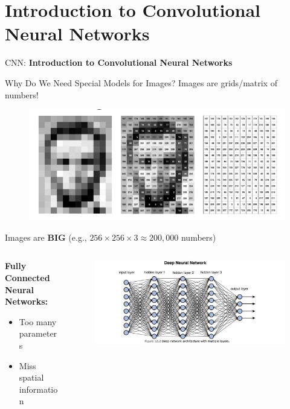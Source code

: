 \section{Introduction to Convolutional Neural Networks}
\begin{frame}{}
    \LARGE CNN: \textbf{Introduction to Convolutional Neural Networks}
\end{frame}

\begin{frame}[allowframebreaks]{Why Do We Need Special Models for Images?}
    Images are grids/matrix of numbers!
    \begin{figure}
        \centering
        \includegraphics[height=0.8\textheight,width=1\textwidth,keepaspectratio]{images/cnn/represent_image.png}
    \end{figure}
    Images are \textbf{BIG} (e.g., $256 \times 256 \times 3 \approx 200,\!000$ numbers)
    \framebreak
    
    \begin{columns}
        \begin{column}{0.35\textwidth}
            \textbf{Fully Connected Neural Networks:} \\[2em]
            \begin{itemize}
                \setlength{\itemsep}{1em}
                \item Too many parameters
                \item Miss spatial information
            \end{itemize}
        \end{column}
        \begin{column}{0.75\textwidth}
            \begin{figure}
                \centering
                \includegraphics[height=0.8\textheight,width=1.05\textwidth,keepaspectratio]{images/cnn/nn.jpg}
            \end{figure}


\end{column}
\end{columns}
\end{frame}
